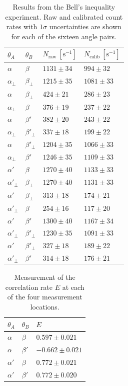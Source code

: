 \documentclass[letter,scriptaddress,twocolumn, prl, nofootinbib]{revtex4}
\begin{document}
{\begin{table} %
    \centering
    \begin{tabular}{p{1.5cm}p{1.5cm}p{1.5cm}p{1.5cm}}
\hline
\hline
$\theta_A$ & $\theta_B$ & $N_{\text{raw}} \ [\text{s}^{-1}]$ & $N_{\text{calib}} \ [\text{s}^{-1}]$ \\
\hline
$\alpha$ & $\beta$ & $1131 \pm 34$ & $994 \pm 32$ \\
$\alpha_{\perp}$ & $\beta_{\perp}$ & $1215 \pm 35$ & $1081 \pm 33$ \\
$\alpha$ & $\beta_{\perp}$ & $424 \pm 21$ & $286 \pm 23$ \\
$\alpha_{\perp}$ & $\beta$ & $376 \pm 19$ & $237 \pm 22$ \\
$\alpha$ & $\beta'$ & $382 \pm 20$ & $243 \pm 22$ \\
$\alpha_{\perp}$ & $\beta'_{\perp}$ & $337 \pm 18$ & $199 \pm 22$ \\
$\alpha$ & $\beta'_{\perp}$ & $1204 \pm 35$ & $1066 \pm 33$ \\
$\alpha_{\perp}$ & $\beta'$ & $1246 \pm 35$ & $1109 \pm 33$ \\
$\alpha'$ & $\beta$ & $1270 \pm 40$ & $1133 \pm 33$ \\
$\alpha'_{\perp}$ & $\beta_{\perp}$ & $1270 \pm 40$ & $1131 \pm 33$ \\
$\alpha'$ & $\beta_{\perp}$ & $313 \pm 18$ & $174 \pm 21$ \\
$\alpha'_{\perp}$ & $\beta$ & $254 \pm 16$ & $117 \pm 20$ \\
$\alpha'$ & $\beta'$ & $1300 \pm 40$ & $1167 \pm 34$ \\
$\alpha'_{\perp}$ & $\beta'_{\perp}$ & $1230 \pm 35$ & $1091 \pm 33$ \\
$\alpha'$ & $\beta'_{\perp}$ & $327 \pm 18$ & $189 \pm 22$ \\
$\alpha'_{\perp}$ & $\beta'$ & $314 \pm 18$ & $176 \pm 21$ \\
\hline
\hline
\end{tabular}
    \caption{Results from the Bell's inequality experiment. Raw and calibrated count rates with $1\sigma$ uncertainties are shown for each of the sixteen angle pairs.}
    \label{tab:counts}
\end{table}

\begin{table}[h]
    \centering
    \begin{tabular}{p{1.5cm}p{1.5cm}p{3cm}}
\hline
\hline
$\theta_A$ & $\theta_B$ & $E$ \\
\hline
$\alpha$ & $\beta$ & $0.597 \pm 0.021$ \\ 
$\alpha$ & $\beta'$ & $-0.662 \pm 0.021$ \\ 
$\alpha'$ & $\beta$ & $0.772 \pm 0.021$ \\ 
$\alpha'$ & $\beta'$ & $0.772 \pm 0.020$ \\
\hline
\hline
\end{tabular}
    \caption{Measurement of the correlation rate $E$ at each of the four measurement locations.}
    \label{tab:agreement}
\end{table}



}
\end{document}
